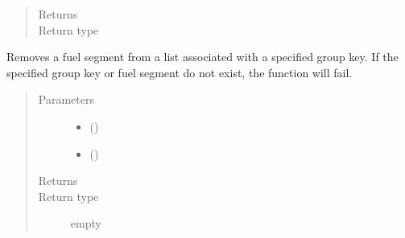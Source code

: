 \documentclass[letterpaper,10pt,openany,oneside,english]{sphinxmanual}
\begin{document}
\begin{fulllineitems}
\begin{fulllineitems}
\begin{quote}
\begin{description}
\item[{Returns}] \leavevmode
{}

\item[{Return type}] \leavevmode
{}

\end{description}\end{quote}

\end{fulllineitems}


\begin{fulllineitems}
\label{\detokenize{support_rst/fuelsegmentsgroups:fuelsegmentsgroups.FuelSegmentsGroups.RemoveFuelSegment}}
Removes a fuel segment from a list associated with a specified group
key. If the specified group key or fuel segment do not exist, the
function will fail.
\begin{quote}\begin{description}
\item[{Parameters}] \leavevmode\begin{itemize}
\item {} 
 () \textendash{} 

\item {} 
 () \textendash{} 

\end{itemize}

\item[{Returns}] \leavevmode


\item[{Return type}] \leavevmode
empty

\end{description}\end{quote}

\end{fulllineitems}


\end{fulllineitems}
\end{document}
